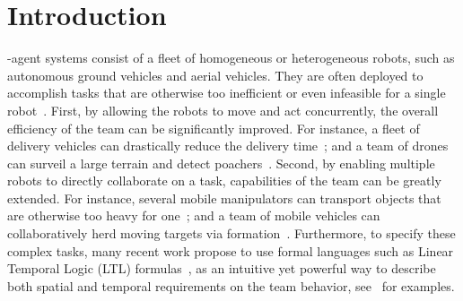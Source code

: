 \section{Introduction}\label{sec:introduction}

-agent systems consist of a fleet of homogeneous or heterogeneous robots,
such as autonomous ground vehicles and aerial vehicles.
They are often deployed to accomplish tasks that are otherwise too inefficient or even infeasible for a single robot~\cite{arai2002advances}.
First,
by allowing the robots to move and act concurrently,
the overall efficiency of the team can be significantly improved.
For instance,
a fleet of delivery vehicles can drastically reduce the delivery time~\cite{toth2002overview};
and a team of drones can surveil a large terrain and detect poachers~\cite{cliff2015online}.
Second,
by enabling multiple robots to directly collaborate on a task,
capabilities of the team can be greatly extended.
For instance,
several mobile manipulators can transport objects that are otherwise too heavy for one~\cite{fink2008multi};
and a team of mobile vehicles can collaboratively herd moving targets via formation~\cite{varava2017herding}.
Furthermore, to specify these complex tasks,
many recent work propose to use formal languages such as Linear Temporal Logic (LTL)
formulas~\cite{baier2008principles}, as an intuitive yet powerful way to describe
both spatial and temporal requirements on the team behavior,
see~\cite{ulusoy2013optimality, kantaros2020stylus, schillinger2018simultaneous, guo2018multirobot} for examples.


